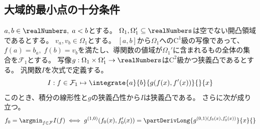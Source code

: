         \subsection{大域的最小点の十分条件}
            \label{汎関数の大域的最小点の十分条件}
            \begin{shadebox}
                $a,b\in\realNumbers,\;a<b$とする。
                $\Omega_1,\Omega_1'\subseteq\realNumbers$は空でない開凸領域であるとする。
                $v_a,v_b\in\Omega_1$とする。
                $[a,b]$から$\Omega_1$への$\mathrm{C}^1$級の写像であって、$f(a)=b_a,\;f(b)=v_b$を満たし、導関数の値域が$\Omega_1'$に含まれるもの全体の集合を$\mathcal{F}_1$とする。
                写像$g:\Omega_1\times\Omega_1'\to\realNumbers$は$\mathrm{C}^2$級かつ狭義凸であるとする。
                汎関数$I$を次式で定義する。
                \[I: f\in\mathcal{F}_1 \mapsto \integrate{a}{b}{g(f(x),f'(x))}{}{x}\]
                このとき、積分の線形性と$g$の狭義凸性から$I$は狭義凸である。
                さらに次が成り立つ。
                \[ f_0 = \argmin_{f\in\mathcal{F}}I(f) \iff g^{(1,0)}(f_0(x),f_0'(x)) = \partDerivLong{g^{(0,1)(f_0(x),f_0'(x))}}{x}{} \]
            \end{shadebox}
